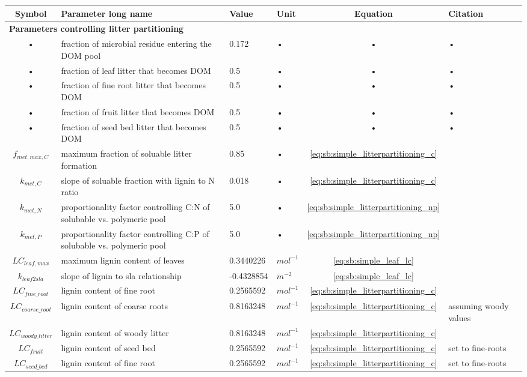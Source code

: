 \documentclass[11pt,oneside,openright,a4paper,fleqn]{book}  %
\begin{document}
\begin{table}
\begin{tabularx}{\linewidth}{|c|X|l|l|c|l|X|} %
\hline 
Symbol & Parameter long name & Value & Unit & Equation & Citation \\
\hline 

\multicolumn{6}{l}{\bf Parameters controlling litter partitioning}\\
\hline
• & fraction of microbial residue entering the DOM pool & 0.172 & • & • & • \\
• & fraction of leaf litter that becomes DOM & 0.5 & • & • & • \\
• & fraction of fine root litter that becomes DOM & 0.5 & • & • & • \\
• & fraction of fruit litter that becomes DOM & 0.5 & • & • & • \\
• & fraction of seed bed litter that becomes DOM & 0.5 & • & • & • \\
$f_{met,max,C}$ & maximum fraction of soluable litter formation &  0.85 & • & \ref{eq:sb:simple_litterpartitioning_c} & \cite{Parton:1993ud}\\
$k_{met,C}$ & slope of soluable fraction with lignin to N ratio &  0.018 & • & \ref{eq:sb:simple_litterpartitioning_c} & \cite{Parton:1993ud}\\
$k_{met,N}$ & proportionality factor controlling C:N of solubable vs. polymeric pool  & 5.0 & • & \ref{eq:sb:simple_litterpartitioning_np} & \cite{Parton:1993ud}\\
$k_{met,P}$ & proportionality factor controlling C:P of solubable vs. polymeric pool & 5.0 & • & \ref{eq:sb:simple_litterpartitioning_np} & \cite{Parton:1993ud}\\
$LC_{leaf,max}$ & maximum lignin content of leaves & 0.3440226 & $mol^{-1}$ &  \ref{eq:sb:simple_leaf_lc} & \cite{White:2000vl}\\
$k_{leaf2sla}$ & slope of lignin to sla relationship & -0.4328854 & $m^{-2}$ &  \ref{eq:sb:simple_leaf_lc} & \cite{White:2000vl}\\
$LC_{fine\_root}$ & lignin content of fine root & 0.2565592 & $mol^{-1}$ &  \ref{eq:sb:simple_litterpartitioning_c} & \cite{White:2000vl}\\
$LC_{coarse\_root}$ & lignin content of coarse roots & 0.8163248 & $mol^{-1}$ &  \ref{eq:sb:simple_litterpartitioning_c} & assuming woody values\\
$LC_{woody\_litter}$ & lignin content of woody litter & 0.8163248 & $mol^{-1}$ &  \ref{eq:sb:simple_litterpartitioning_c} & \cite{White:2000vl}\\
$LC_{fruit}$ & lignin content of seed bed & 0.2565592 & $mol^{-1}$ & \ref{eq:sb:simple_litterpartitioning_c} & set to fine-roots\\
$LC_{seed\_bed}$ & lignin content of fine root & 0.2565592 & $mol^{-1}$ & \ref{eq:sb:simple_litterpartitioning_c} & set to fine-roots\\

\hline 
\end{tabularx}
\end{table}
\end{document}
